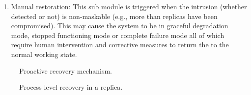 \documentclass[preprint,number,12pt]{elsarticle}
\newenvironment{boxedalgorithmic}
{\begin{lrbox}{\ieeealgbox}
\begin{minipage}{\dimexpr\columnwidth-2\fboxsep-2\fboxrule}
\begin{algorithmic}}
{\end{algorithmic}
\end{minipage}
\end{lrbox}\noindent\fbox{\usebox{\ieeealgbox}}}
\begin{document}
\begin {enumerate}
process, it will obtain the relevant checkpoint, kills the process and activates its peer from the standby set (if there is any) otherwise the system level recovery will be performed. The process level recovery is time-saving compared to system level recovery as well as it is more secure since it involves internal information and communication exchange in a machine. Moreover, it does not require the replica to go offline for performing the recovery.
\item Manual restoration: This sub module is triggered when the intrusion (whether detected or not) is non-maskable (e.g., more than  replicas have been compromised). This may cause the system to be in graceful degradation mode, stopped functioning mode or complete failure mode all of which require human intervention and corrective measures to return the to the normal working state.
\end{enumerate}
\begin{figure}
\begin{boxedalgorithmic}
\State  
\While{}
\State 
\EndWhile
\State 
\State 
\State 
\State 
\State 
\State 
\State 
\EndProcedure
\end{boxedalgorithmic}
\caption{Proactive recovery mechanism.}\label{fig:proactiveRecovery}
\end{figure}
\begin{figure}
\begin{boxedalgorithmic}
\While{}
\State 
\EndWhile
\State 
{}
\If{}
\State 
\State 
\State 
\Else
\If{}
\State 
\State 
\State 
\State 
\State 
\State 
\State 
\EndIf
\EndIf
\EndFor
\State 
\EndProcedure
\end{boxedalgorithmic}
\caption{Process level recovery in a replica.}\label{fig:processLevelrecovery}
\end{figure}

 \begin{comment}
\begin{figure}[!t]
\centering
\texttt{[image: proactiveRecovery]}
\caption{Proactive recovery mechanism.}
\label{fig:proactiveRecovery}
\end{figure}
\begin{figure}[!t]
\centering
\texttt{[image: ProcessLevelRecovery]}
\caption{Process level recovery in a replica.}
\label{fig:processLevelrecovery}
\end{figure}
\end{comment}
\end{document}
